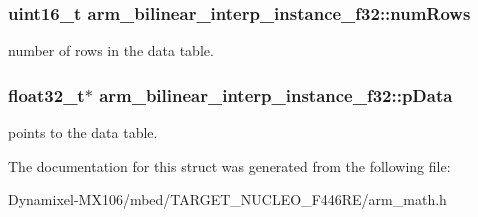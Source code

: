 \subsubsection[{\texorpdfstring{num\+Rows}{numRows}}]{\setlength{\rightskip}{0pt plus 5cm}uint16\+\_\+t arm\+\_\+bilinear\+\_\+interp\+\_\+instance\+\_\+f32\+::num\+Rows}\hypertarget{structarm__bilinear__interp__instance__f32_a34f2b17cc57b95011960df9718af6ed6}{}\label{structarm__bilinear__interp__instance__f32_a34f2b17cc57b95011960df9718af6ed6}
number of rows in the data table. 
\subsubsection[{\texorpdfstring{p\+Data}{pData}}]{\setlength{\rightskip}{0pt plus 5cm}float32\+\_\+t$\ast$ arm\+\_\+bilinear\+\_\+interp\+\_\+instance\+\_\+f32\+::p\+Data}\hypertarget{structarm__bilinear__interp__instance__f32_afd1e764591c991c212d56c893efb5ea4}{}\label{structarm__bilinear__interp__instance__f32_afd1e764591c991c212d56c893efb5ea4}
points to the data table. 

The documentation for this struct was generated from the following file\+:\begin{DoxyCompactItemize}
\item 
Dynamixel-\/\+M\+X106/mbed/\+T\+A\+R\+G\+E\+T\+\_\+\+N\+U\+C\+L\+E\+O\+\_\+\+F446\+R\+E/arm\+\_\+math.\+h\end{DoxyCompactItemize}
